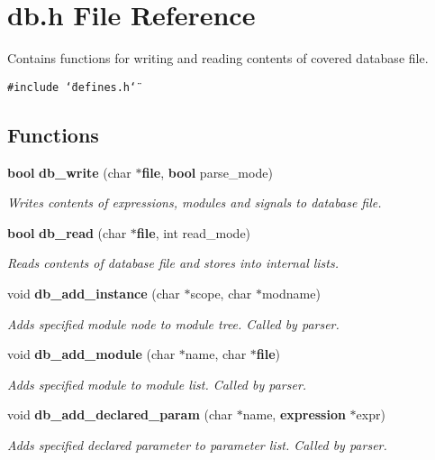 \section{db.h File Reference}
\label{db_8h}
Contains functions for writing and reading contents of covered database file. 


{\tt \#include \char`\"{}defines.h\char`\"{}}\par
\subsection*{Functions}
\begin{CompactItemize}
\item 
{\bf bool} {\bf db\_\-write} (char $\ast${\bf file}, {\bf bool} parse\_\-mode)
\begin{CompactList}\small\item\em Writes contents of expressions, modules and signals to database file.\item\end{CompactList}\item 
{\bf bool} {\bf db\_\-read} (char $\ast${\bf file}, int read\_\-mode)
\begin{CompactList}\small\item\em Reads contents of database file and stores into internal lists.\item\end{CompactList}\item 
void {\bf db\_\-add\_\-instance} (char $\ast$scope, char $\ast$modname)
\begin{CompactList}\small\item\em Adds specified module node to module tree. Called by parser.\item\end{CompactList}\item 
void {\bf db\_\-add\_\-module} (char $\ast$name, char $\ast${\bf file})
\begin{CompactList}\small\item\em Adds specified module to module list. Called by parser.\item\end{CompactList}\item 
void {\bf db\_\-add\_\-declared\_\-param} (char $\ast$name, {\bf expression} $\ast$expr)
\begin{CompactList}\small\item\em Adds specified declared parameter to parameter list. Called by parser.\item\end{CompactList}\item 

\end{CompactItemize}
